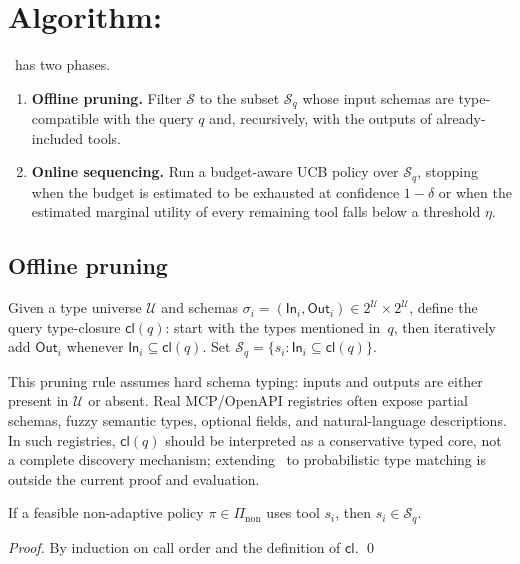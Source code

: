 \section{Algorithm: \CBUC}
\label{sec:algorithm}

\CBUC~has two phases.
\begin{enumerate}
  \item \textbf{Offline pruning.} Filter $\mathcal{S}$ to the subset
    $\mathcal{S}_q$ whose input schemas are type-compatible with the
    query $q$ and, recursively, with the outputs of
    already-included tools.
  \item \textbf{Online sequencing.} Run a budget-aware UCB policy over
    $\mathcal{S}_q$, stopping when the budget is estimated to be
    exhausted at confidence $1-\delta$ or when the estimated marginal
    utility of every remaining tool falls below a threshold $\eta$.
\end{enumerate}

\subsection{Offline pruning}
Given a type universe $\mathcal{U}$ and schemas
$\sigma_i = (\mathsf{In}_i, \mathsf{Out}_i) \in 2^{\mathcal{U}} \times 2^{\mathcal{U}}$, define the query type-closure $\mathsf{cl}(q)$:
start with the types mentioned in~$q$, then iteratively add
$\mathsf{Out}_i$ whenever $\mathsf{In}_i \subseteq \mathsf{cl}(q)$. Set
$\mathcal{S}_q = \{s_i : \mathsf{In}_i \subseteq \mathsf{cl}(q)\}$.

This pruning rule assumes hard schema typing: inputs and outputs are
either present in $\mathcal{U}$ or absent. Real MCP/OpenAPI registries
often expose partial schemas, fuzzy semantic types, optional fields,
and natural-language descriptions. In such registries,
$\mathsf{cl}(q)$ should be interpreted as a conservative typed core,
not a complete discovery mechanism; extending \CBUC~to probabilistic
type matching is outside the current proof and evaluation.

\begin{proposition}
\label{prop:prune}
If a feasible non-adaptive policy $\pi \in \Pi_{\mathrm{non}}$ uses
tool $s_i$, then $s_i \in \mathcal{S}_q$.
\end{proposition}

\begin{proof}
By induction on call order and the definition of $\mathsf{cl}$. \qed
\end{proof}

